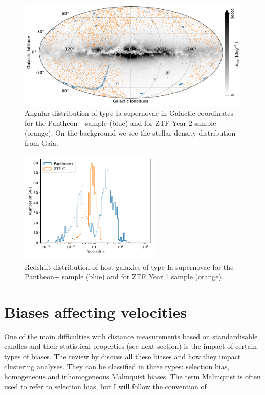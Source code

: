     \begin{figure} 
        \centering 
        \includegraphics[width=\textwidth]{fig/velocities/ztf_pantheon_gaia.pdf}
        \caption{Angular distribution of type-Ia supernovae in Galactic coordinates
        for the Pantheon+ sample (blue) and for ZTF Year 2 sample (orange). 
        On the background we see the stellar density distribution from Gaia. 
        }
        \label{fig:pantheon_ztf_sky}
    \end{figure}

    \begin{figure} 
        \centering 
        \includegraphics[width=0.6\textwidth]{fig/velocities/nz_ztfy1_pantheon.pdf}
        \caption{Redshift distribution of host galaxies of type-Ia supernovae 
        for the Pantheon+ sample (blue) and for ZTF Year 1 sample (orange).
        }
        \label{fig:pantheon_ztf_redshift}
    \end{figure}

\section{Biases affecting velocities}
\label{velocities:biases}

One of the main difficulties with distance measurements based on standardisable candles 
and their statistical properties (see next section) is the impact of certain types of biases. 
The review by \cite{straussDensityPeculiarVelocity1995} discuss all these biases and how they  
impact clustering analyses. They can be classified in three types: selection bias, homogeneous 
and inhomogeneous Malmquist biases. The term Malmquist is often used to refer to selection bias,
but I will follow the convention of \cite{straussDensityPeculiarVelocity1995}. 

